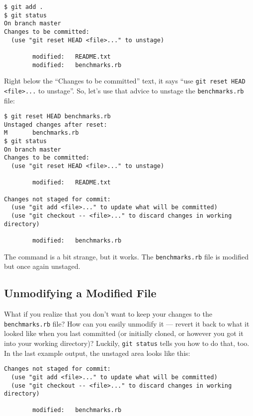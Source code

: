 \documentclass[a4paper]{book}
\begin{document}
\begin{shaded}\begin{verbatim}
$ git add .
$ git status
On branch master
Changes to be committed:
  (use "git reset HEAD <file>..." to unstage)

        modified:   README.txt
        modified:   benchmarks.rb
\end{verbatim}\end{shaded}

Right below the “Changes to be committed” text, it says “use \texttt{git reset HEAD \textless{}file\textgreater{}...} to unstage”. So, let's use that advice to unstage the \texttt{benchmarks.rb} file:

\begin{shaded}\begin{verbatim}
$ git reset HEAD benchmarks.rb
Unstaged changes after reset:
M       benchmarks.rb
$ git status
On branch master
Changes to be committed:
  (use "git reset HEAD <file>..." to unstage)

        modified:   README.txt

Changes not staged for commit:
  (use "git add <file>..." to update what will be committed)
  (use "git checkout -- <file>..." to discard changes in working directory)

        modified:   benchmarks.rb
\end{verbatim}\end{shaded}

The command is a bit strange, but it works. The \texttt{benchmarks.rb} file is modified but once again unstaged.

\subsection{Unmodifying a Modified File}\label{unmodifying-a-modified-file}

What if you realize that you don't want to keep your changes to the \texttt{benchmarks.rb} file? How can you easily unmodify it --- revert it back to what it looked like when you last committed (or initially cloned, or however you got it into your working directory)? Luckily, \texttt{git status} tells you how to do that, too. In the last example output, the unstaged area looks like this:

\begin{shaded}\begin{verbatim}
Changes not staged for commit:
  (use "git add <file>..." to update what will be committed)
  (use "git checkout -- <file>..." to discard changes in working directory)

        modified:   benchmarks.rb
\end{verbatim}\end{shaded}
\end{document}
